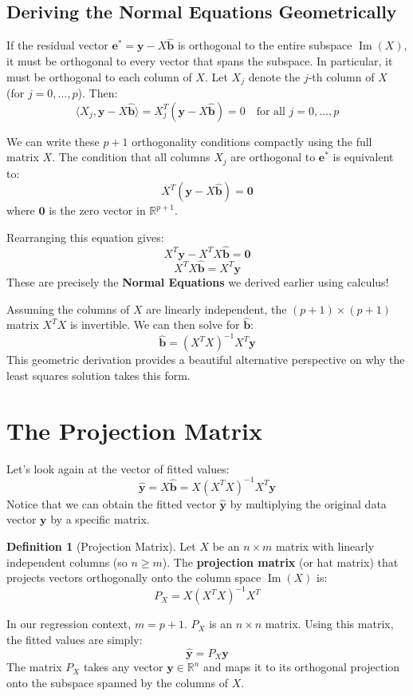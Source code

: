 \documentclass[11pt]{article}
\theoremstyle{definition}
\newtheorem{definition}[theorem]{Definition}
\DeclareMathOperator{\Image}{Im} %
\newcommand{\vect}[1]{\mathbf{#1}} %
\begin{document}
\subsection{Deriving the Normal Equations Geometrically}

If the residual vector $\vect{e}^* = \vect{y} - X\hat{\vect{b}}$ is orthogonal to the entire subspace $\Image(X)$, it must be orthogonal to every vector that spans the subspace. In particular, it must be orthogonal to each column of $X$. Let $X_j$ denote the $j$-th column of $X$ (for $j=0, \dots, p$). Then:
\[ \langle X_j, \vect{y} - X\hat{\vect{b}} \rangle = X_j^T (\vect{y} - X\hat{\vect{b}}) = 0 \quad \text{for all } j=0, \dots, p \]

We can write these $p+1$ orthogonality conditions compactly using the full matrix $X$. The condition that all columns $X_j$ are orthogonal to $\vect{e}^*$ is equivalent to:
\[ X^T (\vect{y} - X\hat{\vect{b}}) = \vect{0} \]
where $\vect{0}$ is the zero vector in $\mathbb{R}^{p+1}$.

Rearranging this equation gives:
\[ X^T \vect{y} - X^T X \hat{\vect{b}} = \vect{0} \]
\[ \boxed{X^T X \hat{\vect{b}} = X^T \vect{y}} \]
These are precisely the \textbf{Normal Equations} we derived earlier using calculus!

Assuming the columns of $X$ are linearly independent, the $(p+1) \times (p+1)$ matrix $X^T X$ is invertible. We can then solve for $\hat{\vect{b}}$:
\[ \hat{\vect{b}} = (X^T X)^{-1} X^T \vect{y} \]
This geometric derivation provides a beautiful alternative perspective on why the least squares solution takes this form.

\section{The Projection Matrix}

Let's look again at the vector of fitted values:
\[ \hat{\vect{y}} = X\hat{\vect{b}} = X (X^T X)^{-1} X^T \vect{y} \]
Notice that we can obtain the fitted vector $\hat{\vect{y}}$ by multiplying the original data vector $\vect{y}$ by a specific matrix.

\begin{definition}[Projection Matrix]
Let $X$ be an $n \times m$ matrix with linearly independent columns (so $n \ge m$). The \textbf{projection matrix} (or hat matrix) that projects vectors orthogonally onto the column space $\Image(X)$ is:
\[ P_X = X(X^T X)^{-1} X^T \]
\end{definition}
In our regression context, $m = p+1$. $P_X$ is an $n \times n$ matrix. Using this matrix, the fitted values are simply:
\[ \hat{\vect{y}} = P_X \vect{y} \]
The matrix $P_X$ takes any vector $\vect{y} \in \mathbb{R}^n$ and maps it to its orthogonal projection onto the subspace spanned by the columns of $X$.
\end{document}
